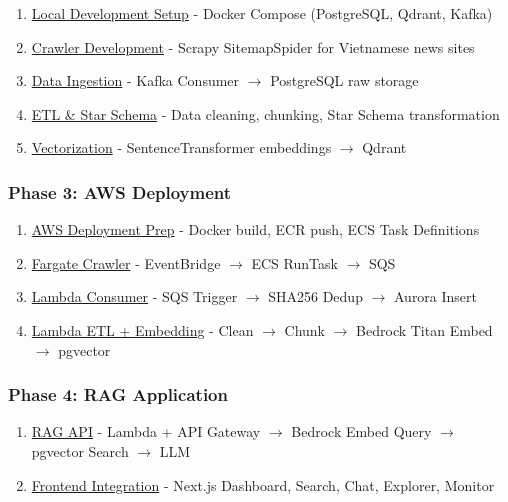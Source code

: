 \begin{enumerate}
\def\labelenumi{\arabic{enumi}.}
\setcounter{enumi}{3}
\tightlist
\item
  \href{5.4-Local-Dev/}{Local Development Setup} - Docker Compose
  (PostgreSQL, Qdrant, Kafka)
\item
  \href{5.5-Crawler/}{Crawler Development} - Scrapy SitemapSpider for
  Vietnamese news sites
\item
  \href{5.6-Ingestion/}{Data Ingestion} - Kafka Consumer \(\rightarrow\)
  PostgreSQL raw storage
\item
  \href{5.7-ETL/}{ETL \& Star Schema} - Data cleaning, chunking, Star
  Schema transformation
\item
  \href{5.8-Vectorize/}{Vectorization} - SentenceTransformer embeddings
  \(\rightarrow\) Qdrant
\end{enumerate}

\hypertarget{phase-3-aws-deployment}{%
\subsubsection{Phase 3: AWS Deployment}}

\begin{enumerate}
\def\labelenumi{\arabic{enumi}.}
\setcounter{enumi}{8}
\tightlist
\item
  \href{5.9-AWS-Deploy/}{AWS Deployment Prep} - Docker build, ECR push,
  ECS Task Definitions
\item
  \href{5.10-Fargate-Crawler/}{Fargate Crawler} - EventBridge
  \(\rightarrow\) ECS RunTask \(\rightarrow\) SQS
\item
  \href{5.11-Lambda-Consumer/}{Lambda Consumer} - SQS Trigger
  \(\rightarrow\) SHA256 Dedup \(\rightarrow\) Aurora Insert
\item
  \href{5.12-Lambda-ETL/}{Lambda ETL + Embedding} - Clean
  \(\rightarrow\) Chunk \(\rightarrow\) Bedrock Titan Embed
  \(\rightarrow\) pgvector
\end{enumerate}

\hypertarget{phase-4-rag-application}{%
\subsubsection{Phase 4: RAG Application}}

\begin{enumerate}
\def\labelenumi{\arabic{enumi}.}
\setcounter{enumi}{12}
\tightlist
\item
  \href{5.13-RAG-API/}{RAG API} - Lambda + API Gateway \(\rightarrow\)
  Bedrock Embed Query \(\rightarrow\) pgvector Search \(\rightarrow\)
  LLM
\item
  \href{5.14-Frontend/}{Frontend Integration} - Next.js Dashboard,
  Search, Chat, Explorer, Monitor
\end{enumerate}

